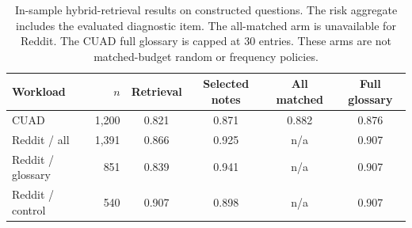 \begin{table}[t]\centering\small
\caption{In-sample hybrid-retrieval results on constructed questions. The risk aggregate includes the evaluated diagnostic item. The all-matched arm is unavailable for Reddit. The CUAD full glossary is capped at 30 entries. These arms are not matched-budget random or frequency policies.}
\label{tab:selection}
\begin{tabular}{@{}lrcccc@{}}\toprule
Workload & $n$ & Retrieval & Selected notes & All matched & Full glossary\\\midrule
CUAD & 1,200 & 0.821 & 0.871 & 0.882 & 0.876\\
Reddit / all & 1,391 & 0.866 & 0.925 & n/a & 0.907\\
Reddit / glossary & 851 & 0.839 & 0.941 & n/a & 0.907\\
Reddit / control & 540 & 0.907 & 0.898 & n/a & 0.907\\
\bottomrule\end{tabular}\end{table}